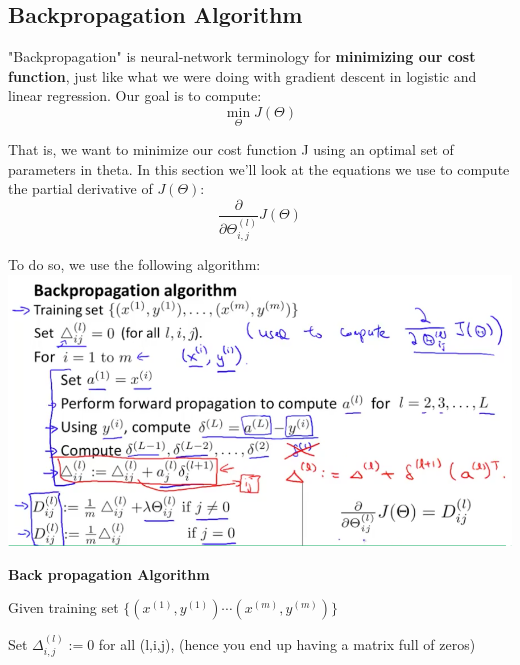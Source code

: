 \documentclass{report}
\begin{document}
\subsection{Backpropagation Algorithm}
"Backpropagation" is neural-network terminology for \textbf{minimizing our cost function}, just like what we were doing with gradient descent in logistic and linear regression. Our goal is to compute:
$$\min_\Theta J(\Theta)$$

That is, we want to minimize our cost function J using an optimal set of parameters in theta. In this section we'll look at the equations we use to compute the partial derivative of $J(\Theta)$:
$$\dfrac{\partial}{\partial \Theta_{i,j}^{(l)}}J(\Theta)$$

To do so, we use the following algorithm:\\
\includegraphics[width=\textwidth]{Backpropagation_Algorithm.png}

\noindent\textbf{Back propagation Algorithm}

Given training set $\lbrace (x^{(1)}, y^{(1)}) \cdots (x^{(m)}, y^{(m)})\rbrace$

Set $\Delta^{(l)}_{i,j} := 0$ for all (l,i,j), (hence you end up having a matrix full of zeros)
\end{document}
